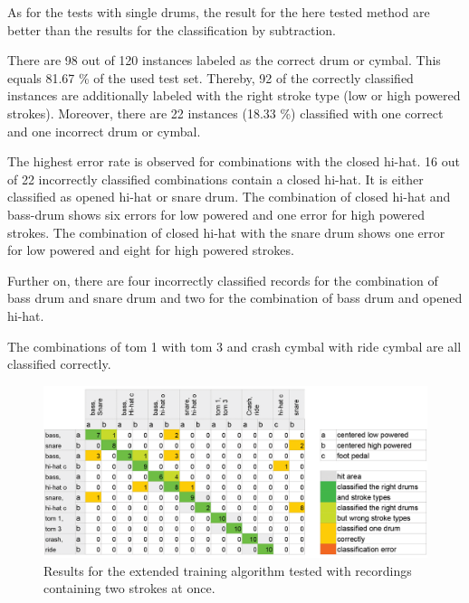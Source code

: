 As for the tests with single drums, the result for the here tested method are better than the results for the classification by subtraction. 

There are 98 out of 120 instances labeled as the correct drum or cymbal. This equals 81.67 \% of the used test set. Thereby, 92 of the correctly classified instances are additionally labeled with the right stroke type (low or high powered strokes). Moreover, there are 22 instances (18.33 \%) classified with one correct and one incorrect drum or cymbal. 

The highest error rate is observed for combinations with the closed hi-hat. 16 out of 22 incorrectly classified combinations contain a closed hi-hat. It is either classified as opened hi-hat or snare drum. The combination of closed hi-hat and bass-drum shows six errors for low powered and one error for high powered strokes. The combination of closed hi-hat with the snare drum shows one error for low powered and eight for high powered strokes.

Further on, there are four incorrectly classified records for the combination of bass drum and snare drum and two for the combination of bass drum and opened hi-hat. 

The combinations of tom 1 with tom 3 and crash cymbal with ride cymbal are all classified correctly.

\begin{figure}[htbp]
	\centering
	\includegraphics[width=.9\textwidth]{images/classification_matrix/multiple2_test_multiple.png}
	\caption{Results for the extended training algorithm tested with recordings containing two strokes at once.}
	\label{fig:multiple22}
\end{figure}

